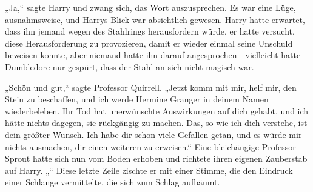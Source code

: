 „Ja,“ sagte Harry und zwang sich, das Wort auszusprechen.
Es war eine Lüge, ausnahmsweise, und Harrys Blick war absichtlich gewesen. Harry hatte erwartet, dass ihn jemand wegen des Stahlrings herausfordern würde, er hatte versucht, diese Herausforderung zu provozieren, damit er wieder einmal seine Unschuld beweisen konnte, aber niemand hatte ihn darauf angesprochen—vielleicht hatte Dumbledore nur gespürt, dass der Stahl an sich nicht magisch war.

„Schön und gut,“ sagte Professor Quirrell. „Jetzt komm mit mir, helf mir, den Stein zu beschaffen, und ich werde Hermine Granger in deinem Namen wiederbeleben. Ihr Tod hat unerwünschte Auswirkungen auf dich gehabt, und ich hätte nichts dagegen, sie rückgängig zu machen. Das, so wie ich dich verstehe, ist dein größter Wunsch. Ich habe dir schon viele Gefallen getan, und es würde mir nichts ausmachen, dir einen weiteren zu erweisen.“
Eine bleichäugige Professor Sprout hatte sich nun vom Boden erhoben und richtete ihren eigenen Zauberstab auf Harry.
„“
Diese letzte Zeile zischte er mit einer Stimme, die den Eindruck einer Schlange vermittelte, die sich zum Schlag aufbäumt.

